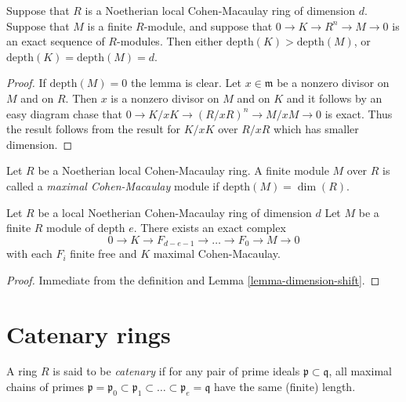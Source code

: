 \begin{lemma}
\label{lemma-dimension-shift}
Suppose that $R$ is a Noetherian local Cohen-Macaulay ring of dimension $d$.
Suppose that $M$ is a finite $R$-module, and suppose that
$0 \to K \to R^{n} \to M \to 0$ is an exact sequence of $R$-modules.
Then either $\text{depth}(K) > \text{depth}(M)$, or
$\text{depth}(K) = \text{depth}(M) = d$.
\end{lemma}

\begin{proof}
If $\text{depth}(M) = 0$ the lemma is clear.
Let $x \in \mathfrak m$ be a nonzero divisor on $M$ and
on $R$. Then $x$ is a nonzero divisor on $M$ and on $K$
and it follows by an easy diagram chase that
$0 \to K/xK \to (R/xR)^n \to M/xM \to 0$ is exact.
Thus the result follows from the result for $K/xK$
over $R/xR$ which has smaller dimension.
\end{proof}

\begin{definition}
\label{definition-maximal-CM}
Let $R$ be a Noetherian local Cohen-Macaulay ring.
A finite module $M$ over $R$ is called a {\it maximal
Cohen-Macaulay} module if $\text{depth}(M) = \dim(R)$.
\end{definition}

\begin{lemma}
\label{lemma-mcm-resolution}
Let $R$ be a local Noetherian Cohen-Macaulay ring of dimension $d$
Let $M$ be a finite $R$ module of depth $e$.
There exists an exact complex
$$
0 \to K \to F_{d-e-1} \to \ldots \to F_0 \to M \to 0
$$
with each $F_i$ finite free and $K$ maximal Cohen-Macaulay.
\end{lemma}

\begin{proof}
Immediate from the definition and Lemma \ref{lemma-dimension-shift}.
\end{proof}








\section{Catenary rings}
\label{section-catenary}

\begin{definition}
\label{definition-catenary}
A ring $R$ is said to be {\it catenary} if for any pair of prime ideals
$\mathfrak p \subset \mathfrak q$, all maximal chains of primes
$\mathfrak p = \mathfrak p_0 \subset \mathfrak p_1 \subset \ldots \subset
\mathfrak p_e = \mathfrak q$ have the same (finite) length.
\end{definition}

